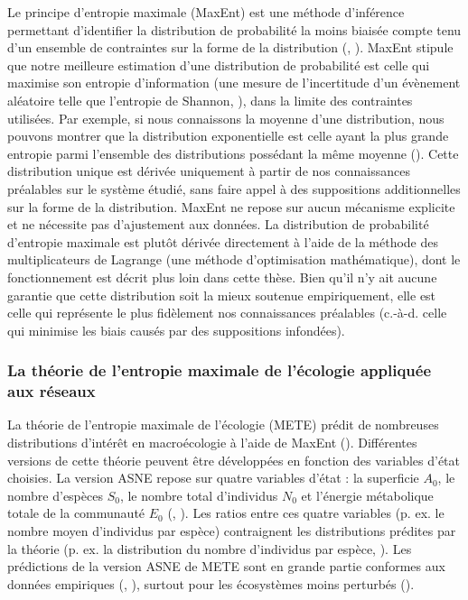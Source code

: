 Le principe d'entropie maximale (MaxEnt) est une méthode d'inférence permettant
d'identifier la distribution de probabilité la moins biaisée compte tenu d'un
ensemble de contraintes sur la forme de la distribution
(\cite{Jaynes1957Informationa}, \cite{Jaynes1957Information}). MaxEnt stipule
que notre meilleure estimation d'une distribution de probabilité est celle qui
maximise son entropie d'information (une mesure de l'incertitude d'un évènement
aléatoire telle que l'entropie de Shannon, \cite{Shannon1948Mathematical}), dans
la limite des contraintes utilisées. Par exemple, si nous connaissons la moyenne
d'une distribution, nous pouvons montrer que la distribution exponentielle est
celle ayant la plus grande entropie parmi l'ensemble des distributions possédant
la même moyenne (\cite{Frank2011Simple}). Cette distribution unique est dérivée
uniquement à partir de nos connaissances préalables sur le système étudié, sans
faire appel à des suppositions additionnelles sur la forme de la distribution.
MaxEnt ne repose sur aucun mécanisme explicite et ne nécessite pas d'ajustement
aux données. La distribution de probabilité d'entropie maximale est plutôt
dérivée directement à l'aide de la méthode des multiplicateurs de Lagrange (une
méthode d'optimisation mathématique), dont le fonctionnement est décrit plus
loin dans cette thèse. Bien qu'il n'y ait aucune garantie que cette distribution
soit la mieux soutenue empiriquement, elle est celle qui représente le plus
fidèlement nos connaissances préalables (c.-à-d. celle qui minimise les biais
causés par des suppositions infondées). 

\subsubsection{La théorie de l'entropie maximale de l'écologie appliquée aux réseaux} 

La théorie de l'entropie maximale de l'écologie (METE) prédit de nombreuses
distributions d'intérêt en macroécologie à l'aide de MaxEnt
(\cite{Harte2011Maximum}). Différentes versions de cette théorie peuvent être
développées en fonction des variables d'état choisies. La version ASNE repose
sur quatre variables d'état : la superficie $A_0$, le nombre d'espèces $S_0$, le
nombre total d'individus $N_0$ et l'énergie métabolique totale de la communauté
$E_0$ (\cite{Harte2008Maximum}, \cite{Harte2014Maximum}). Les ratios entre ces
quatre variables (p. ex. le nombre moyen d'individus par espèce) contraignent
les distributions prédites par la théorie (p. ex. la distribution du nombre
d'individus par espèce, \cite{Brummer2019Derivations}). Les prédictions de la
version ASNE de METE sont en grande partie conformes aux données empiriques
(\cite{Harte2011Maximum}, \cite{McGlinn2015Exploring}), surtout pour les
écosystèmes moins perturbés (\cite{Newman2020Disturbance}). 

